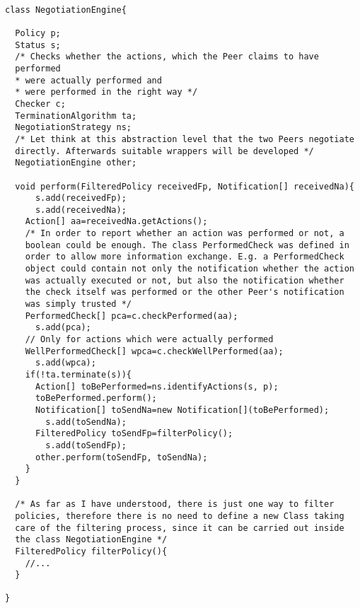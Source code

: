 \documentclass{article}
\begin{document}
\begin{verbatim}

class NegotiationEngine{

  Policy p;
  Status s;
  /* Checks whether the actions, which the Peer claims to have
  performed
  * were actually performed and
  * were performed in the right way */
  Checker c;
  TerminationAlgorithm ta;
  NegotiationStrategy ns;
  /* Let think at this abstraction level that the two Peers negotiate
  directly. Afterwards suitable wrappers will be developed */
  NegotiationEngine other;

  void perform(FilteredPolicy receivedFp, Notification[] receivedNa){
      s.add(receivedFp);
      s.add(receivedNa);
    Action[] aa=receivedNa.getActions();
    /* In order to report whether an action was performed or not, a
    boolean could be enough. The class PerformedCheck was defined in
    order to allow more information exchange. E.g. a PerformedCheck
    object could contain not only the notification whether the action
    was actually executed or not, but also the notification whether
    the check itself was performed or the other Peer's notification
    was simply trusted */
    PerformedCheck[] pca=c.checkPerformed(aa);
      s.add(pca);
    // Only for actions which were actually performed
    WellPerformedCheck[] wpca=c.checkWellPerformed(aa);
      s.add(wpca);
    if(!ta.terminate(s)){
      Action[] toBePerformed=ns.identifyActions(s, p);
      toBePerformed.perform();
      Notification[] toSendNa=new Notification[](toBePerformed);
        s.add(toSendNa);
      FilteredPolicy toSendFp=filterPolicy();
        s.add(toSendFp);
      other.perform(toSendFp, toSendNa);
    }
  }
  
  /* As far as I have understood, there is just one way to filter
  policies, therefore there is no need to define a new Class taking
  care of the filtering process, since it can be carried out inside
  the class NegotiationEngine */
  FilteredPolicy filterPolicy(){
    //...
  }

}

\end{verbatim}
\end{document}

